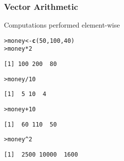 \documentclass[13pt,aspectratio=169]{beamer}\usepackage[]{graphicx}\usepackage[]{color}
\makeatletter
\newcommand{\hlnum}[1]{\textcolor[rgb]{0.686,0.059,0.569}{#1}}%
\newcommand{\hlopt}[1]{\textcolor[rgb]{0,0,0}{#1}}%
\newcommand{\hlstd}[1]{\textcolor[rgb]{0.345,0.345,0.345}{#1}}%
\newcommand{\hlkwb}[1]{\textcolor[rgb]{0.69,0.353,0.396}{#1}}%
\newcommand{\hlkwd}[1]{\textcolor[rgb]{0.737,0.353,0.396}{\textbf{#1}}}%
\newenvironment{kframe}{%
 \def\at@end@of@kframe{}%
 \ifinner\ifhmode%
  \def\at@end@of@kframe{\end{minipage}}%
  \begin{minipage}{\columnwidth}%
 \fi\fi%
 \def\FrameCommand##1{\hskip\@totalleftmargin \hskip-\fboxsep
 \colorbox{shadecolor}{##1}\hskip-\fboxsep
     \hskip-\linewidth \hskip-\@totalleftmargin \hskip\columnwidth}%
 \MakeFramed {\advance\hsize-\width
   \@totalleftmargin\z@ \linewidth\hsize
   \@setminipage}}%
 {\par\unskip\endMakeFramed%
 \at@end@of@kframe}
\newenvironment{knitrout}{}{} %
\renewenvironment{knitrout}{\setlength{\topsep}{0mm}}{}
\makeatother
\begin{document}
\begin{frame}[fragile]
    \frametitle{Vector Arithmetic}
\vskip10pt
Computations performed element-wise
\vskip10pt
\begin{knitrout}\small
{}\color{fgcolor}\begin{kframe}
\begin{alltt}
\hlstd{> }\hlstd{money} \hlkwb{<-} \hlkwd{c}\hlstd{(}\hlnum{50}\hlstd{,} \hlnum{100}\hlstd{,} \hlnum{40}\hlstd{)}
\hlstd{> }\hlstd{money} \hlopt{*} \hlnum{2}
\end{alltt}
\begin{verbatim}
[1] 100 200  80
\end{verbatim}
\begin{alltt}
\hlstd{> }\hlstd{money} \hlopt{/} \hlnum{10}
\end{alltt}
\begin{verbatim}
[1]  5 10  4
\end{verbatim}
\begin{alltt}
\hlstd{> }\hlstd{money} \hlopt{+} \hlnum{10}
\end{alltt}
\begin{verbatim}
[1]  60 110  50
\end{verbatim}
\begin{alltt}
\hlstd{> }\hlstd{money} \hlopt{^} \hlnum{2}
\end{alltt}
\begin{verbatim}
[1]  2500 10000  1600
\end{verbatim}
\end{kframe}
\end{knitrout}
\end{frame}
\end{document}
